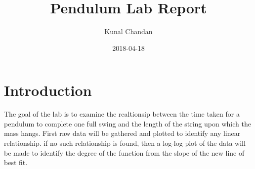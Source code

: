 \documentclass[letter,12pt]{article}
\begin{document}
\title{Pendulum Lab Report}
\date{2018-04-18}
\author{Kunal Chandan}

\maketitle
{}
\newpage
{}

\section{Introduction}
The goal of the lab is to examine the realtionsip between the time taken for a pendulum to complete one full swing and the length of the string upon which the mass hangs.
First raw data will be gathered and plotted to identify any linear relationship. if no such relationship is found, then a log-log plot of the data will be made to identify the degree of the function from the slope of the new line of best fit.

%
\end{document}
